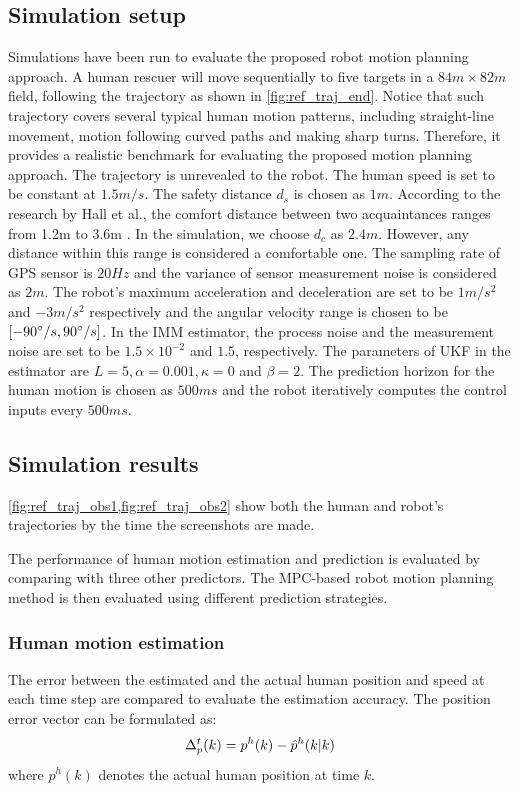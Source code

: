 \documentclass[letterpaper, 10 pt, conference]{ieeeconf}
\begin{document}
	\subsection{Simulation setup}
	Simulations have been run to evaluate the proposed robot motion planning approach. 
	A human rescuer will move sequentially to five targets in a $84 m\times 82 m$ field, following the trajectory as shown in \cref{fig:ref_traj_end}.
	Notice that such trajectory covers several typical human motion patterns, including straight-line movement, motion following curved paths and making sharp turns.
	Therefore, it provides a realistic benchmark for evaluating the proposed motion planning approach.
	The trajectory is unrevealed to the robot.
	The human speed is set to be constant at $1.5m/s$. 
	The safety distance $d_s$ is chosen as $1m$.
	According to the research by Hall et al., the comfort distance between two acquaintances ranges from 1.2m to 3.6m \cite{hall1968proxemics}.
	In the simulation, we choose $d_c$ as $2.4m$.
	However, any distance within this range is considered a comfortable one.
	The sampling rate of GPS sensor is $20Hz$ and the variance of sensor measurement noise is considered as $2m$. 
	The robot's maximum acceleration and deceleration are set to be $1 m/s^2$ and $-3 m/s^2$ respectively and the angular velocity range is chosen to be $[-90\degree/s,90\degree/s]$.
	In the IMM estimator, the process noise and the measurement noise are set to be $1.5\times 10^{-2}$ and $1.5$, respectively. The parameters of UKF in the estimator are $L=5,\alpha=0.001, \kappa=0$ and $\beta=2$.
	The prediction horizon for the human motion is chosen as $500ms$ and the robot iteratively computes the control inputs every $500ms$.
	
	\subsection{Simulation results}
	\cref{fig:ref_traj_obs1,fig:ref_traj_obs2} show both the human and robot's trajectories by the time the screenshots are made.
	
	The performance of human motion estimation and prediction is evaluated by comparing with three other predictors. The MPC-based robot motion planning method is then evaluated using different prediction strategies.
	\subsubsection{Human motion estimation}\label{subsubsec:motion_est}
	The error between the estimated and the actual human position and speed at each time step are compared to evaluate the estimation accuracy.
	The position error vector can be formulated as:
	\[
	\Delta^{t}_p(k)=p^h(k)-\hat{p}^h(k|k)\label{eqn:track_err_pos}\\
	\]
	where $p^h(k)$ denotes the actual human position at time $k$. 
	
\end{document}
